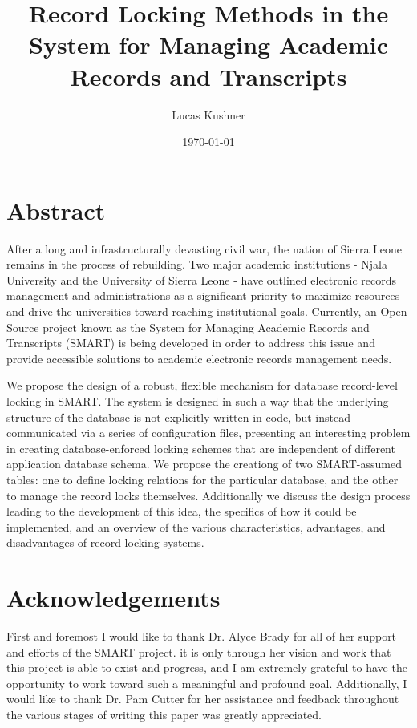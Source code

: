 \documentclass[12pt]{article}
\title{Record Locking Methods in the System for Managing Academic Records and Transcripts}
\author{Lucas Kushner}
\date{\today}
\begin{document}
\begin{titlepage}
    \maketitle
    \thispagestyle{empty}
\end{titlepage}

\newpage\null\thispagestyle{empty}\newpage

\doublespace

\section*{Abstract}
After a long and infrastructurally devasting civil war, the nation of Sierra Leone remains in the process of rebuilding. Two major academic institutions - Njala University and the University of Sierra Leone - have outlined electronic records management and administrations as a significant priority to maximize resources and drive the universities toward reaching institutional goals. Currently, an Open Source project known as the System for Managing Academic Records and Transcripts (SMART) is being developed in order to address this issue and provide accessible solutions to academic electronic records management needs.

We propose the design of a robust, flexible mechanism for database record-level locking in SMART. The system is designed in such a way that the underlying structure of the database is not explicitly written in code, but instead communicated via a series of configuration files, presenting an interesting problem in creating database-enforced locking schemes that are independent of different application database schema. We propose the creationg of two SMART-assumed tables: one to define locking relations for the particular database, and the other to manage the record locks themselves. Additionally we discuss the design process leading to the development of this idea, the specifics of how it could be implemented, and an overview of the various characteristics, advantages, and disadvantages of record locking systems.

\newpage

\section*{Acknowledgements}
First and foremost I would like to thank Dr. Alyce Brady for all of her support and efforts of the SMART project. it is only through her vision and work that this project is able to exist and progress, and I am extremely grateful to have the opportunity to work toward such a meaningful and profound goal. Additionally, I would like to thank Dr. Pam Cutter for her assistance and feedback throughout the various stages of writing this paper was greatly appreciated.
\end{document}
